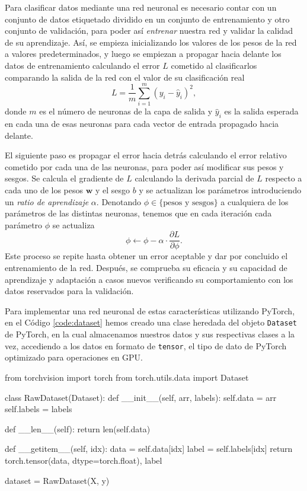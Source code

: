Para clasificar datos mediante una red neuronal es necesario contar con un conjunto de datos etiquetado dividido en un conjunto de entrenamiento y otro conjunto de validación, para poder así \textit{entrenar} nuestra red y validar la calidad de su aprendizaje. Así, se empieza inicializando los valores de los pesos de la red a valores predeterminados, y luego se empiezan a propagar hacia delante los datos de entrenamiento calculando el error $ L $ cometido al clasificarlos comparando la salida de la red con el valor de su clasificación real
\begin{equation}
  L = \frac{1}{m} \sum_{i=1}^{m}(y_i - \hat{y}_i)^2,
\end{equation}
donde $ m $ es el número de neuronas de la capa de salida y $ \hat{y}_i $ es la salida esperada en cada una de esas neuronas para cada vector de entrada propagado hacia delante.

El siguiente paso es propagar el error hacia detrás calculando el error relativo cometido por cada una de las neuronas, para poder así modificar sus pesos y sesgos. Se calcula el gradiente de $ L $ calculando la derivada parcial de $ L $ respecto a cada uno de los pesos $ \mathbf{w} $ y el sesgo $ b $ y se actualizan los parámetros introduciendo un \textit{ratio de aprendizaje} $ \alpha $. Denotando $ \phi \in \{\text{pesos y sesgos}\} $ a cualquiera de los parámetros de las distintas neuronas, tenemos que en cada iteración cada parámetro $ \phi $ se actualiza
\begin{equation}
  \phi \leftarrow \phi - \alpha \cdot \frac{\partial L}{\partial \phi}.
\end{equation}
Este proceso se repite hasta obtener un error aceptable y dar por concluido el entrenamiento de la red. Después, se comprueba su eficacia y su capacidad de aprendizaje y adaptación a casos nuevos verificando su comportamiento con los datos reservados para la validación.

Para implementar una red neuronal de estas características utilizando PyTorch, en el Código \ref{code:dataset} hemos creado una clase heredada del objeto \texttt{Dataset} de PyTorch, en la cual almacenamos nuestros datos y sus respectivas clases a la vez, accediendo a los datos en formato de \texttt{tensor}, el tipo de dato de PyTorch optimizado para operaciones en GPU.

\begin{mypython}[float={h}, caption={\texttt{Dataset} de los datos artificiales.}, label={code:dataset}]
from torchvision import torch
from torch.utils.data import Dataset

class RawDataset(Dataset):
  def __init__(self, arr, labels):
      self.data = arr
      self.labels = labels

  def __len__(self):
      return len(self.data)

  def __getitem__(self, idx):
      data = self.data[idx]
      label = self.labels[idx]
      return torch.tensor(data, dtype=torch.float), label

dataset = RawDataset(X, y)
\end{mypython}

